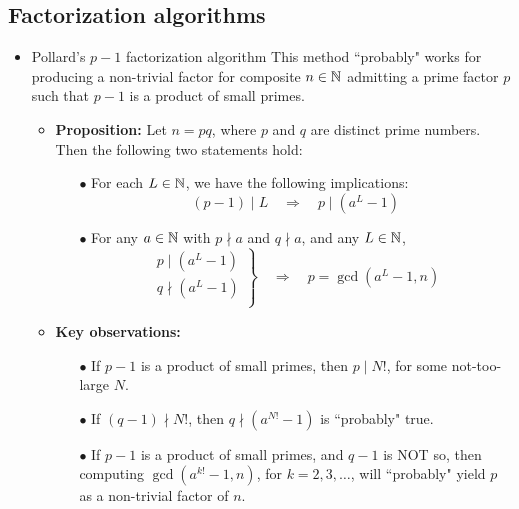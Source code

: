 \subsection{Factorization algorithms}

\begin{itemize}
\item	Pollard's $p-1$ factorization algorithm
		\vskip 0.1cm
		This method {\color{red}``probably"} works for producing a non-trivial factor for composite $n \in \mathbb{N}$
		admitting a prime factor $p$ such that {\color{red}$p-1$ is a product of small primes.}
		\begin{itemize}
		\item	\textbf{Proposition:}\quad
				Let $n = pq$, where $p$ and $q$ are distinct prime numbers.
				Then the following two statements hold:
				\begin{itemize}
				\item[$\bullet$]	For each $L \in \mathbb{N}$, we have the following implications:
								\begin{equation*}
								(p-1) \mid L \quad \Longrightarrow \quad p \mid (a^{L} - 1)
								\end{equation*}				
				\item[$\bullet$]	For any $a \in \mathbb{N}$ with $p \nmid a$ and $q \nmid a$, and any $L \in \mathbb{N}$, 
								\begin{equation*}
								\left.\begin{array}{l}
								p \mid (a^{L} - 1) \\
								q \nmid (a^{L} -1) \\
								\end{array}\right\}
								\quad\Longrightarrow\quad
								p = \gcd(a^{L}-1,n)
								\end{equation*}
				\end{itemize}
		\item	\textbf{Key observations:}
				\begin{itemize}
				\item[$\bullet$]	If $p-1$ is a product of small primes, then $p \mid N!$, for some not-too-large $N$.  
				\item[$\bullet$]	If $(q-1) \nmid N!$, then $q \nmid (a^{N!}-1)$ is ``probably" true.
				\item[$\bullet$]	If $p-1$ is a product of small primes, and $q-1$ is NOT so, then
								computing $\gcd(a^{k!}-1,n)$, for $k = 2,3,\ldots$, will ``probably" yield
								$p$ as a non-trivial factor of $n$.

\end{itemize}
\end{itemize}
\end{itemize}
